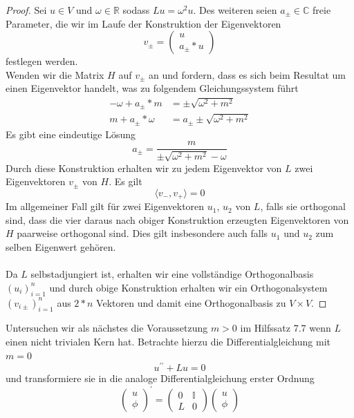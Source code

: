 \documentclass[11pt,a4paper,leqno]{report}
\numberwithin{equation}{chapter}
\begin{document}
\begin{proof}
	Sei $u\in V$ und $\omega\in \mathbb{R}$ sodass $Lu = \omega^2 u$. Des weiteren seien $a_\pm\in\mathbb{C}$ freie Parameter, die wir im Laufe der Konstruktion der Eigenvektoren 
	\begin{equation*}
		v_\pm=\begin{pmatrix}
			u \\ a_\pm*u
		\end{pmatrix}
	\end{equation*}
festlegen werden.\\
	Wenden wir die Matrix $H$ auf $v_\pm$ an und fordern, dass es sich beim Resultat um einen Eigenvektor handelt, was zu folgendem Gleichungssystem f\"uhrt
	\begin{align*}
		-\omega + a_\pm*m &= \pm\sqrt{\omega^2 + m^2}\\
		m + a_\pm*\omega &= a_\pm\pm\sqrt{\omega^2 + m^2}
	\end{align*}
	Es gibt eine eindeutige L\"osung
	\begin{equation*}
		a_\pm = \frac{m}{\pm\sqrt{\omega^2 + m^2}-\omega}
	\end{equation*} 
	Durch diese Konstruktion erhalten wir zu jedem Eigenvektor von $L$ zwei Eigenvektoren $v_\pm$ von $H$. Es gilt
	\begin{equation*}
		\langle v_-, v_+\rangle=0 
	\end{equation*}
	Im allgemeiner Fall gilt f\"ur zwei Eigenvektoren $u_1$, $u_2$ von $L$, falls sie orthogonal sind, dass
	die vier daraus nach obiger Konstruktion erzeugten Eigenvektoren von $H$ paarweise orthogonal sind. Dies gilt insbesondere auch falls $u_1$ und $u_2$ zum selben Eigenwert geh\"oren.\\
	\\
	Da $L$ selbstadjungiert ist, erhalten wir eine vollst\"andige Orthogonalbasis $(u_i)_{i=1}^n$ und durch obige Konstruktion erhalten wir ein Orthogonalsystem $(v_{i\pm})_{i=1}^n$ aus $2*n$ Vektoren und damit eine Orthogonalbasis zu $V\times V$.
\end{proof}
\noindent
Untersuchen wir als n\"achstes die Voraussetzung $m>0$ im Hilfssatz 7.7 wenn $L$ einen nicht trivialen Kern hat.
Betrachte hierzu die Differentialgleichung mit $m=0$
\begin{equation}
	u^{\prime \prime} + Lu =0
\end{equation}
und transformiere sie in die analoge Differentialgleichung erster Ordnung
\begin{equation}
	\begin{pmatrix}
		u  \\ \phi 
	\end{pmatrix}^\prime=
	\begin{pmatrix}
		0 & \mathbb{I} \\ 
		L & 0
	\end{pmatrix}
	\begin{pmatrix}
		u  \\ \phi 
	\end{pmatrix}
\end{equation}
\end{document}
